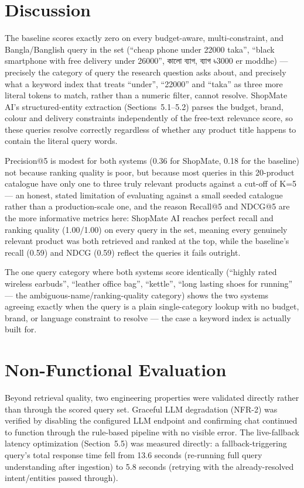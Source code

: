 \documentclass[12pt,a4paper]{report}
\newcommand{\bn}[1]{{\bengalifont #1}}
\begin{document}
\section{Discussion}
The baseline scores exactly zero on every budget-aware, multi-constraint, and Bangla/Banglish query in the
set (``cheap phone under 22000 taka'', ``black smartphone with free delivery under 26000'', \bn{কালো
ব্যাগ}, \bn{ব্যাগ ৳3000} er moddhe) --- precisely the category of query the research question asks about,
and precisely what a keyword index that treats ``under'', ``22000'' and ``taka'' as three more literal
tokens to match, rather than a numeric filter, cannot resolve. ShopMate AI's structured-entity extraction
(Sections~5.1--5.2) parses the budget, brand, colour and delivery constraints independently of the
free-text relevance score, so these queries resolve correctly regardless of whether any product title
happens to contain the literal query words.

Precision@5 is modest for both systems (0.36 for ShopMate, 0.18 for the baseline) not because ranking
quality is poor, but because most queries in this 20-product catalogue have only one to three truly
relevant products against a cut-off of K=5 --- an honest, stated limitation of evaluating against a small
seeded catalogue rather than a production-scale one, and the reason Recall@5 and NDCG@5 are the more
informative metrics here: ShopMate AI reaches perfect recall and ranking quality (1.00/1.00) on every query
in the set, meaning every genuinely relevant product was both retrieved and ranked at the top, while the
baseline's recall (0.59) and NDCG (0.59) reflect the queries it fails outright.

The one query category where both systems score identically (``highly rated wireless earbuds'', ``leather
office bag'', ``kettle'', ``long lasting shoes for running'' --- the ambiguous-name/ranking-quality
category) shows the two systems agreeing exactly when the query is a plain single-category lookup with no
budget, brand, or language constraint to resolve --- the case a keyword index is actually built for.

\section{Non-Functional Evaluation}
Beyond retrieval quality, two engineering properties were validated directly rather than through the
scored query set. Graceful LLM degradation (NFR-2) was verified by disabling the configured LLM endpoint
and confirming chat continued to function through the rule-based pipeline with no visible error. The
live-fallback latency optimization (Section~5.5) was measured directly: a fallback-triggering query's total
response time fell from 13.6 seconds (re-running full query understanding after ingestion) to 5.8 seconds
(retrying with the already-resolved intent/entities passed through).
\end{document}
